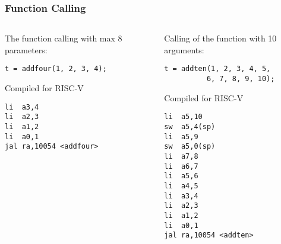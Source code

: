 \documentclass{beamer}
\begin{document}
\begin{frame}[fragile]
\frametitle{Function Calling}

\begin{columns}
\begin{column}{0.5\textwidth}
The function calling with max 8 parameters:

\begin{verbatim}
t = addfour(1, 2, 3, 4);
\end{verbatim}

Compiled for RISC-V
\begin{verbatim}
li  a3,4
li  a2,3
li  a1,2
li  a0,1
jal ra,10054 <addfour>
\end{verbatim}

\end{column}
\begin{column}{0.5\textwidth}  
Calling of the function with 10 arguments:

\begin{verbatim}
t = addten(1, 2, 3, 4, 5, 
          6, 7, 8, 9, 10);
\end{verbatim}

Compiled for RISC-V
\begin{verbatim}
li  a5,10
sw  a5,4(sp)
li  a5,9
sw  a5,0(sp)
li  a7,8
li  a6,7
li  a5,6
li  a4,5
li  a3,4
li  a2,3
li  a1,2
li  a0,1
jal ra,10054 <addten>
\end{verbatim}
\end{column}
\end{columns}
\end{frame}
\end{document}
